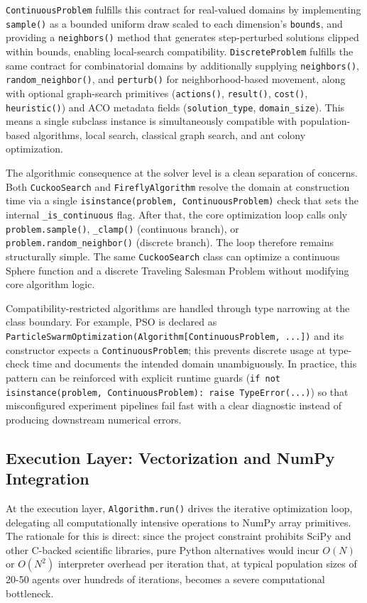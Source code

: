 \texttt{ContinuousProblem} fulfills this contract for real-valued domains by implementing \texttt{sample()} as a bounded uniform draw scaled to each dimension's \texttt{bounds}, and providing a \texttt{neighbors()} method that generates step-perturbed solutions clipped within bounds, enabling local-search compatibility. \texttt{DiscreteProblem} fulfills the same contract for combinatorial domains by additionally supplying \texttt{neighbors()}, \texttt{random\_neighbor()}, and \texttt{perturb()} for neighborhood-based movement, along with optional graph-search primitives (\texttt{actions()}, \texttt{result()}, \texttt{cost()}, \texttt{heuristic()}) and ACO metadata fields (\texttt{solution\_type}, \texttt{domain\_size}). This means a single subclass instance is simultaneously compatible with population-based algorithms, local search, classical graph search, and ant colony optimization.

The algorithmic consequence at the solver level is a clean separation of concerns. Both \texttt{CuckooSearch} and \texttt{FireflyAlgorithm} resolve the domain at construction time via a single \texttt{isinstance(problem, ContinuousProblem)} check that sets the internal \texttt{\_is\_continuous} flag. After that, the core optimization loop calls only \texttt{problem.sample()}, \texttt{\_clamp()} (continuous branch), or \texttt{problem.random\_neighbor()} (discrete branch). The loop therefore remains structurally simple. The same \texttt{CuckooSearch} class can optimize a continuous Sphere function and a discrete Traveling Salesman Problem without modifying core algorithm logic.

Compatibility-restricted algorithms are handled through type narrowing at the class boundary. For example, PSO is declared as \texttt{ParticleSwarmOptimization(Algorithm[ContinuousProblem, ...])} and its constructor expects a \texttt{ContinuousProblem}; this prevents discrete usage at type-check time and documents the intended domain unambiguously. In practice, this pattern can be reinforced with explicit runtime guards (\texttt{if not isinstance(problem, ContinuousProblem): raise TypeError(...)}) so that misconfigured experiment pipelines fail fast with a clear diagnostic instead of producing downstream numerical errors.

\subsection{Execution Layer: Vectorization and NumPy Integration}
At the execution layer, \texttt{Algorithm.run()} drives the iterative optimization loop, delegating all computationally intensive operations to NumPy array primitives. The rationale for this is direct: since the project constraint prohibits SciPy and other C-backed scientific libraries, pure Python alternatives would incur $O(N)$ or $O(N^2)$ interpreter overhead per iteration that, at typical population sizes of 20-50 agents over hundreds of iterations, becomes a severe computational bottleneck.

